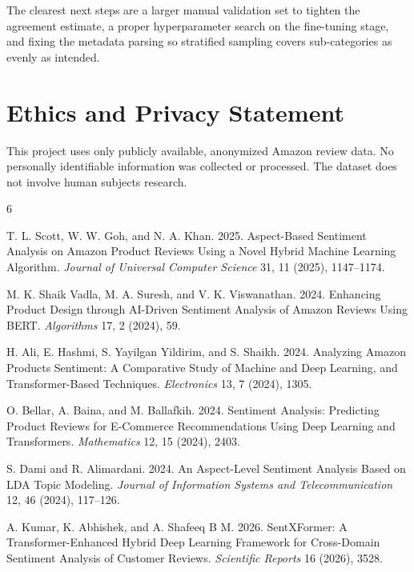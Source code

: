 \documentclass[sigconf]{acmart}
\begin{document}
The clearest next steps are a larger manual validation set to tighten the agreement estimate, a proper hyperparameter search on the fine-tuning stage, and fixing the metadata parsing so stratified sampling covers sub-categories as evenly as intended.

\section*{Ethics and Privacy Statement}
This project uses only publicly available, anonymized Amazon review data. No personally identifiable information was collected or processed. The dataset does not involve human subjects research.


\begin{thebibliography}{6}

T. L. Scott, W. W. Goh, and N. A. Khan. 2025. Aspect-Based Sentiment Analysis on Amazon Product Reviews Using a Novel Hybrid Machine Learning Algorithm. \textit{Journal of Universal Computer Science} 31, 11 (2025), 1147--1174.

M. K. Shaik Vadla, M. A. Suresh, and V. K. Viswanathan. 2024. Enhancing Product Design through AI-Driven Sentiment Analysis of Amazon Reviews Using BERT. \textit{Algorithms} 17, 2 (2024), 59.

H. Ali, E. Hashmi, S. Yayilgan Yildirim, and S. Shaikh. 2024. Analyzing Amazon Products Sentiment: A Comparative Study of Machine and Deep Learning, and Transformer-Based Techniques. \textit{Electronics} 13, 7 (2024), 1305.

O. Bellar, A. Baina, and M. Ballafkih. 2024. Sentiment Analysis: Predicting Product Reviews for E-Commerce Recommendations Using Deep Learning and Transformers. \textit{Mathematics} 12, 15 (2024), 2403.

S. Dami and R. Alimardani. 2024. An Aspect-Level Sentiment Analysis Based on LDA Topic Modeling. \textit{Journal of Information Systems and Telecommunication} 12, 46 (2024), 117--126.

A. Kumar, K. Abhishek, and A. Shafeeq B M. 2026. SentXFormer: A Transformer-Enhanced Hybrid Deep Learning Framework for Cross-Domain Sentiment Analysis of Customer Reviews. \textit{Scientific Reports} 16 (2026), 3528.

\end{thebibliography}
\end{document}

